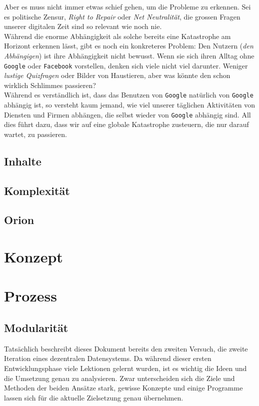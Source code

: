 \documentclass[11pt]{article}
\begin{document}
\noindent Aber es muss nicht immer etwas schief gehen, um die Probleme
zu erkennen. Sei es politische Zensur, \emph{Right to Repair} oder \emph{Net
Neutralität}, die grossen Fragen unserer digitalen Zeit sind so
relevant wie noch nie.\\

\noindent Während die enorme Abhängigkeit als solche bereits eine
Katastrophe am Horizont erkennen lässt, gibt es noch ein konkreteres
Problem: Den Nutzern (\emph{den Abhängigen}) ist ihre Abhängigkeit nicht
bewusst. Wenn sie sich ihren Alltag ohne \texttt{Google} oder \texttt{Facebook}
vorstellen, denken sich viele nicht viel darunter. Weniger \emph{lustige
Quizfragen} oder Bilder von Haustieren, aber was könnte den schon
wirklich Schlimmes passieren?\\

\noindent Während es verständlich ist, dass das Benutzen von \texttt{Google}
natürlich von \texttt{Google} abhängig ist, so versteht kaum jemand, wie viel
unserer täglichen Aktivitäten von Diensten und Firmen abhängen, die
selbst wieder von \texttt{Google} abhängig sind. All dies führt dazu, dass wir
auf eine globale Katastrophe zusteuern, die nur darauf wartet, zu
passieren.
\subsection{Inhalte}
\label{sec:org761e788}
\subsection{Komplexität}
\label{sec:orgfb6cfe6}
\subsection{Orion}
\label{sec:orgb6df3c0}
\section{Konzept}
\label{sec:org06b388e}
\section{Prozess}
\label{sec:org52f7315}
\subsection{Modularität}
\label{sec:org9121afa}
Tatsächlich beschreibt dieses Dokument bereits den zweiten Versuch,
die zweite Iteration eines dezentralen Datensystems. Da während dieser
ersten Entwicklungsphase viele Lektionen gelernt wurden, ist es
wichtig die Ideen und die Umsetzung genau zu analysieren. Zwar
unterscheiden sich die Ziele und Methoden der beiden Ansätze stark,
gewisse Konzepte und einige Programme lassen sich für die aktuelle
Zielsetzung genau übernehmen.\\
\end{document}
